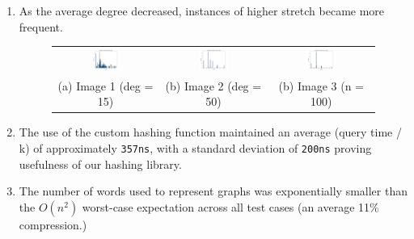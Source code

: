 \documentclass{article}
\begin{document}
\begin{enumerate}
    \item As the average degree decreased, instances of higher stretch became more frequent.
    
    \begin{figure}[H]
        \centering
        \begin{tabular}{ccc}
            \includegraphics[width=0.3\textwidth]{img/test19.png} &
            \includegraphics[width=0.3\textwidth]{img/test20.png} &
            \includegraphics[width=0.3\textwidth]{img/test21.png}\\
            (a) Image 1 (deg = 15) & (b) Image 2 (deg = 50) & (b) Image 3 (n = 100) \\
        \end{tabular}
        \label{fig:555}
    \end{figure}

    \item The use of the custom hashing function maintained an average (query time / k) of approximately \texttt{357ns}, with a standard deviation of \texttt{200ns} proving usefulness of our hashing library.

    \item The number of words used to represent graphs was exponentially smaller than the $O(n^2)$ worst-case expectation across all test cases (an average 11\% compression.)
    
\end{enumerate}
\end{document}
